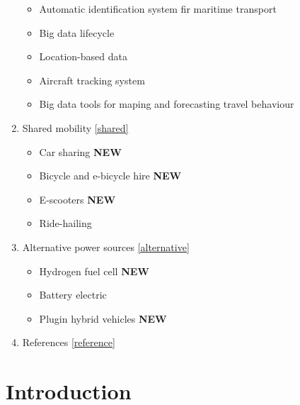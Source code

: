 \documentclass[
]{book}
\providecommand{\tightlist}{%
  \setlength{\itemsep}{0pt}\setlength{\parskip}{0pt}}
\begin{document}
\begin{enumerate}
  \begin{itemize}
  \tightlist
  \item
    Automatic identification system fir maritime transport
  \item
    Big data lifecycle
  \item
    Location-based data
  \item
    Aircraft tracking system
  \item
    Big data tools for maping and forecasting travel behaviour
  \end{itemize}
\item
  Shared mobility \ref{shared}

  \begin{itemize}
  \tightlist
  \item
    Car sharing \textbf{NEW}
  \item
    Bicycle and e-bicycle hire \textbf{NEW}
  \item
    E-scooters \textbf{NEW}
  \item
    Ride-hailing
  \end{itemize}
\item
  Alternative power sources \ref{alternative}

  \begin{itemize}
  \tightlist
  \item
    Hydrogen fuel cell \textbf{NEW}
  \item
    Battery electric
  \item
    Plugin hybrid vehicles \textbf{NEW}
  \end{itemize}
\item
  References \ref{reference}
\end{enumerate}

\hypertarget{intro}{%
\chapter{Introduction}\label{intro}}
\end{document}
